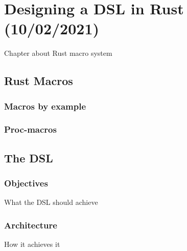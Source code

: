 \chapter{Designing a DSL in Rust (10/02/2021)}\label{cha:rust-dsl}
Chapter about Rust macro system

\section{Rust Macros}
\subsection{Macros by example}
\subsection{Proc-macros}

\section{The DSL}
\subsection{Objectives}
What the DSL should achieve
\subsection{Architecture}
How it achieves it